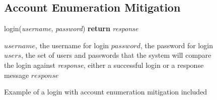 \documentclass{ueacmpstyle}
\begin{document}
            \begin{figure}[ht]
              \subsection{Account Enumeration Mitigation}
              \label{sec:account-enumeration}
              \centering
              \begin{algorithm}[H]
              \caption{login(\emph{username}, \emph{password}) {\bf return} \emph{response}}
                \begin{algorithmic}[1]
                  \Require $username$, the username for login
                  \Require $password$, the password for login
                  \Require $users$, the set of users and passwords that the system will 
                            compare the login against
                  \Ensure \emph{response}, either a successful login or a response message
                      \Else
                      \EndIf
                    \Else
                    \EndIf
                  \EndFor
                  \State \Return $response$
                \end{algorithmic}
              \end{algorithm}
              \caption{Example of a login with account enumeration mitigation included}
              \label{fig:account-enumeration}
          \end{figure}
\end{document}
